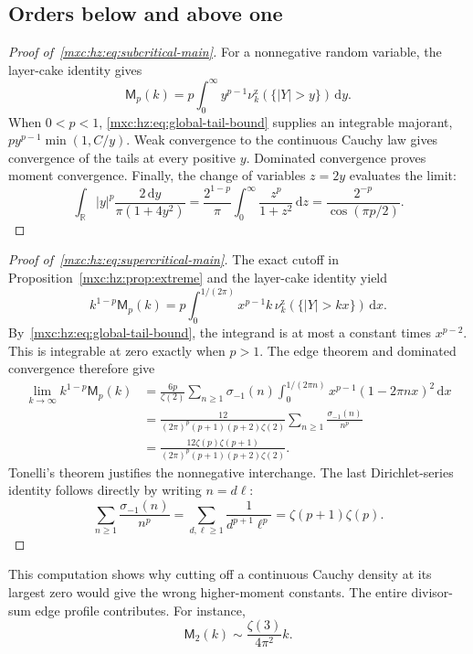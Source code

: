 \documentclass[11pt]{article}
\numberwithin{equation}{section}
\theoremstyle{definition}
\theoremstyle{remark}
\newcommand{\dd}{\,\mathrm d}
\newcommand{\hznu}{\nu^{\mathrm z}}
\begin{document}
\subsection{Orders below and above one}

\begin{proof}[Proof of~\eqref{mxc:hz:eq:subcritical-main}]
For a nonnegative random variable, the layer-cake identity gives
\[
 \mathsf M_p(k)=p\int_0^\infty y^{p-1}\hznu_k(\{|Y|>y\})\dd y.
\]
When $0<p<1$, \eqref{mxc:hz:eq:global-tail-bound} supplies an integrable
majorant, $py^{p-1}\min(1,C/y)$. Weak convergence to the continuous Cauchy
law gives convergence of the tails at every positive $y$. Dominated
convergence proves moment convergence. Finally, the change of variables
$z=2y$ evaluates the limit:
\[
 \int_{\mathbb R}|y|^p\frac{2\dd y}{\pi(1+4y^2)}
 =\frac{2^{1-p}}{\pi}\int_0^\infty\frac{z^p}{1+z^2}\dd z
 =\frac{2^{-p}}{\cos(\pi p/2)}.
\]
\end{proof}

\begin{proof}[Proof of~\eqref{mxc:hz:eq:supercritical-main}]
The exact cutoff in Proposition~\ref{mxc:hz:prop:extreme} and the
layer-cake identity yield
\[
 k^{1-p}\mathsf M_p(k)
 =p\int_0^{1/(2\pi)}x^{p-1}k\,\hznu_k(\{|Y|>kx\})\dd x.
\]
By~\eqref{mxc:hz:eq:global-tail-bound}, the integrand is at most a constant
times $x^{p-2}$. This is integrable at zero exactly when $p>1$. The edge
theorem and dominated convergence therefore give
\begin{align*}
 \lim_{k\to\infty}k^{1-p}\mathsf M_p(k)
 &=\frac{6p}{\zeta(2)}\sum_{n\ge1}\sigma_{-1}(n)
       \int_0^{1/(2\pi n)}x^{p-1}(1-2\pi nx)^2\dd x\\
 &=\frac{12}{(2\pi)^p(p+1)(p+2)\zeta(2)}
       \sum_{n\ge1}\frac{\sigma_{-1}(n)}{n^p}\\
 &=\frac{12\zeta(p)\zeta(p+1)}{(2\pi)^p(p+1)(p+2)\zeta(2)}.
\end{align*}
Tonelli's theorem justifies the nonnegative interchange. The last
Dirichlet-series identity follows directly by writing $n=d\ell$:
\[
 \sum_{n\ge1}\frac{\sigma_{-1}(n)}{n^p}
 =\sum_{d,\ell\ge1}\frac1{d^{p+1}\ell^p}=\zeta(p+1)\zeta(p).
\]
\end{proof}

This computation shows why cutting off a continuous Cauchy density at its
largest zero would give the wrong higher-moment constants. The entire
divisor-sum edge profile contributes. For instance,
\begin{equation}\label{mxc:hz:eq:second-moment-asymptotic}
 \mathsf M_2(k)\sim\frac{\zeta(3)}{4\pi^2}k.
\end{equation}
\end{document}
